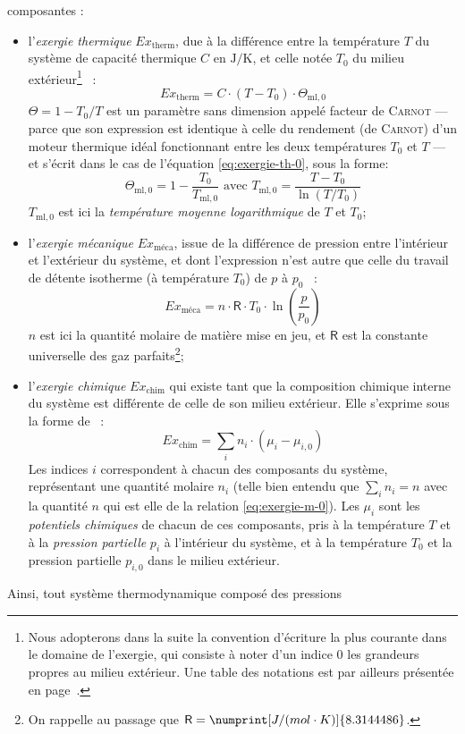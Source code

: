 \documentclass[a4paper,11pt]{scrartcl}
\begin{document}
composantes : \begin{itemize}
	\item l'\emph{exergie thermique} $Ex_{\text{therm}}$, due à la
		différence entre la température $T$ du système de capacité
		thermique $C$ en $\mathrm{J/K}$, et celle notée $T_0$ du milieu
		extérieur\footnote{Nous adopterons dans la suite la
		convention d'écriture la plus courante dans le domaine de
		l'exergie, qui consiste à noter d'un indice $0$ les grandeurs
		propres au milieu extérieur. Une table des notations est par
		ailleurs présentée en
		page~\pageref{table-notations}.}~\cite{entropie-157-0013-0020} :
		\begin{equation}
			Ex_{\text{therm}} = C \cdot (T-T_0) \cdot
			\Theta_{\text{ml},0} \label{eq:exergie-th-0}
		\end{equation} $\Theta=1-T_0/T$ est un paramètre sans dimension
		appelé facteur de \textsc{Carnot} --- parce que son expression
		est identique à celle du rendement (de \textsc{Carnot}) d'un
		moteur thermique idéal fonctionnant entre les deux températures
		$T_0$ et $T$ --- et s'écrit dans le cas de l'équation
		\eqref{eq:exergie-th-0}, sous la forme: \begin{equation}
			\Theta_{\text{ml},0} = 1 - \frac{T_0}{T_{\text{ml},0}}
			\text{ avec } T_{\text{ml},0} =
			\frac{T-T_0}{\ln(T/T_0)}
		\end{equation} $T_{\text{ml},0}$ est ici la \emph{température
		moyenne logarithmique} de $T$ et $T_0$;
	\item l'\emph{exergie mécanique} $Ex_{\text{méca}}$, issue de la
		différence de pression entre l'intérieur et l'extérieur du
		système, et dont l'expression n'est autre que celle du travail
		de détente isotherme (à température $T_0$) de $p$ à
		$p_0$~\cite{TI-BE8013} : \begin{equation}
			Ex_{\text{méca}} = n \cdot \textsf{R} \cdot T_0 \cdot
			\ln\left( \frac{p}{p_0} \right) \label{eq:exergie-m-0}
		\end{equation} $n$ est ici la quantité molaire de matière mise
		en jeu, et $\mathsf{R}$ est la constante universelle des gaz
		parfaits\footnote{On rappelle au passage que $\mathsf{R} =
		\numprint[J/(mol \cdot K)]{8.3144486}$.};
	\item l'\emph{exergie chimique} $Ex_{\text{chim}}$ qui existe tant que
		la composition chimique interne du système est différente de
		celle de son milieu extérieur. Elle s'exprime sous la forme
		de~\cite{TI-BE8015} : \begin{equation}
			Ex_{\text{chim}} = \sum_i n_i \cdot (\mu_i - \mu_{i,0})
		\end{equation} Les indices $i$ correspondent à chacun des
		composants du système, représentant une quantité molaire $n_i$
		(telle bien entendu que $\sum_i n_i = n$ avec la quantité $n$
		qui est elle de la relation \eqref{eq:exergie-m-0}). Les $\mu_i$
		sont les \emph{potentiels chimiques} de chacun de ces
		composants, pris à la température $T$ et à la \emph{pression
		partielle} $p_i$ à l'intérieur du système, et à la température
		$T_0$ et la pression partielle $p_{i,0}$ dans le milieu
		extérieur.
\end{itemize} Ainsi, tout système thermodynamique composé des pressions
\end{document}
